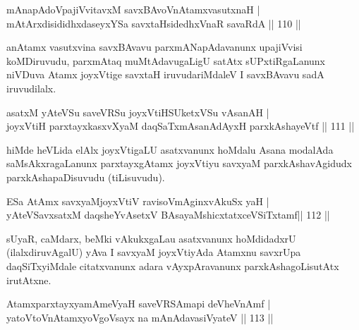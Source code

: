 
\begin{shl}
mAnapAdoVpajiVvitavxM savxBAvoV\s nAtamxvasutxnaH | \\
mAtArxdisididhxdaseyxYSa savxtaHsidedhxVnaR savaRdA \hfill||  110 ||  
\end{shl}

\begin{artha}
anAtamx vasutxvina savxBAvavu parxmANapAdavanunx upajiVvisi koMDiruvudu, parxmAtaq muMtAdavugaLigU satAtx sUPxtiRgaLanunx niVDuva Atamx joyxVtige savxtaH iruvudariMdaleV I savxBAvavu sadA iruvudilalx.
\end{artha}


\begin{shl}
asatxM yAteVSu saveVRSu joyxVtiHSUketxVSu \footnotemark[1]{}vAsanAH | \\
joyxVtiH parxtayxkasxvXyaM daqSaTxmAsanAdAyxH parxkAshayeVtf \hfill||  111 ||  
\end{shl}

\begin{artha}
hiMde heVLida elAlx joyxVtigaLU asatxvanunx hoMdalu Asana modalAda saMsAkxragaLanunx parxtayxgAtamx joyxVtiyu savxyaM parxkAshavAgidudx parxkAshapaDisuvudu (tiLisuvudu).
\end{artha}

\begin{shl}
ESa AtAmx savxyaMjoyxVtiV ravisoVmAginxvAkuSx yaH |  \\
yAteVSavxsatxM daqsheYvA\s \s setxV BAsayaMshicxtatxceVSiTxtamf\hfill ||  112 ||  
\end{shl}

\begin{artha}
sUyaR, caMdarx, beMki vAkukxgaLau asatxvanunx hoMdidadxrU (ilalxdiruvAgalU) yAva I savxyaM joyxVtiyAda Atamxnu savxrUpa daqSiTxyiMdale citatxvanunx adara vAyxpAravanunx parxkAshagoLisutAtx irutAtxne.
\end{artha}

\begin{shl}
AtamxparxtayxyamAmeVyaH saveVRSAmapi deVheVnAmf | \\
yatoV\s toV\s nAtamxyoVgoV\s sayx na mAnAdavasiVyateV \hfill||  113 ||  
\end{shl}

